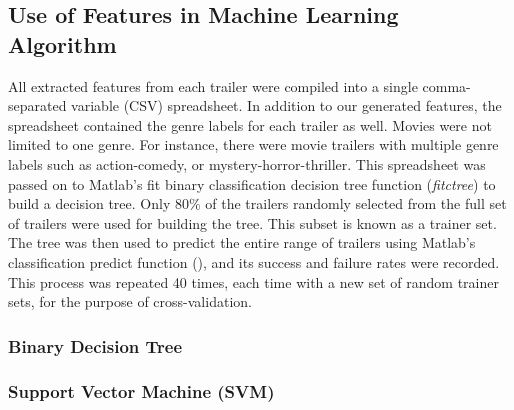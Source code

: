 \documentclass[letterpaper, 10 pt, conference]{ieeeconf}  %
\begin{document}
\subsection{Use of Features in Machine Learning Algorithm}
All extracted features from each trailer were compiled into a single comma-separated variable (CSV) spreadsheet. In addition to our generated features, the spreadsheet contained the genre labels for each trailer as well. Movies were not limited to one genre. For instance, there were movie trailers with multiple genre labels such as action-comedy, or mystery-horror-thriller. This spreadsheet was passed on to Matlab's fit binary classification decision tree function (\textit{fitctree}) to build a decision tree. Only 80\% of the trailers randomly selected from the full set of trailers were used for building the tree. This subset is known as a trainer set. The tree was then used to predict the entire range of trailers using Matlab's classification predict function (), and its success and failure rates were recorded. This process was repeated 40 times, each time with a new set of random trainer sets, for the purpose of cross-validation.
\subsubsection{Binary Decision Tree}
\subsubsection{Support Vector Machine (SVM)}

\end{document}
